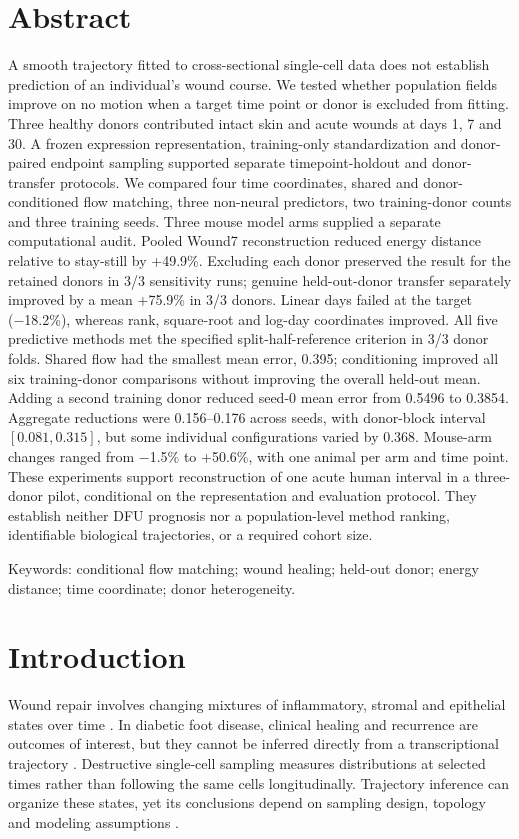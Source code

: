 \documentclass[10pt,a4paper]{article}
\begin{document}
\section*{Abstract}
\noindent A smooth trajectory fitted to cross-sectional single-cell data does not establish prediction of an individual's wound course. We tested whether population fields improve on no motion when a target time point or donor is excluded from fitting.
Three healthy donors contributed intact skin and acute wounds at days 1, 7 and 30. A frozen expression representation, training-only standardization and donor-paired endpoint sampling supported separate timepoint-holdout and donor-transfer protocols. We compared four time coordinates, shared and donor-conditioned flow matching, three non-neural predictors, two training-donor counts and three training seeds. Three mouse model arms supplied a separate computational audit.
Pooled Wound7 reconstruction reduced energy distance relative to stay-still by +49.9\%. Excluding each donor preserved the result for the retained donors in 3/3 sensitivity runs; genuine held-out-donor transfer separately improved by a mean +75.9\% in 3/3 donors. Linear days failed at the target (−18.2\%), whereas rank, square-root and log-day coordinates improved. All five predictive methods met the specified split-half-reference criterion in 3/3 donor folds. Shared flow had the smallest mean error, 0.395; conditioning improved all six training-donor comparisons without improving the overall held-out mean. Adding a second training donor reduced seed-0 mean error from 0.5496 to 0.3854. Aggregate reductions were 0.156--0.176 across seeds, with donor-block interval $[0.081,0.315]$, but some individual configurations varied by 0.368. Mouse-arm changes ranged from −1.5\% to +50.6\%, with one animal per arm and time point.
These experiments support reconstruction of one acute human interval in a three-donor pilot, conditional on the representation and evaluation protocol. They establish neither DFU prognosis nor a population-level method ranking, identifiable biological trajectories, or a required cohort size.
\par\smallskip\noindent Keywords: conditional flow matching; wound healing; held-out donor; energy distance; time coordinate; donor heterogeneity.

\section{Introduction}
Wound repair involves changing mixtures of inflammatory, stromal and epithelial states over time \citep{wilkinson2020}. In diabetic foot disease, clinical healing and recurrence are outcomes of interest, but they cannot be inferred directly from a transcriptional trajectory \citep{armstrong2017}. Destructive single-cell sampling measures distributions at selected times rather than following the same cells longitudinally. Trajectory inference can organize these states, yet its conclusions depend on sampling design, topology and modeling assumptions \citep{saelens2019,weinreb2018}.
\end{document}
